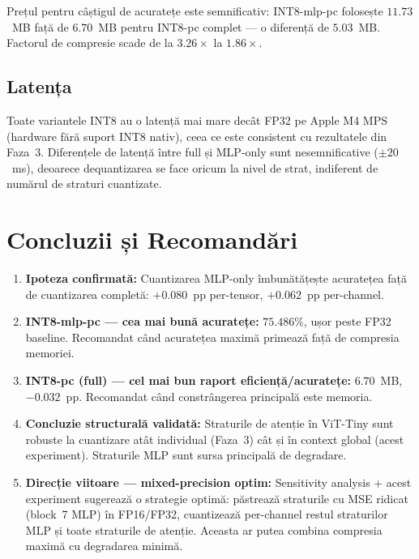 \documentclass[12pt,a4paper]{article}
\begin{document}
Prețul pentru câștigul de acuratețe este semnificativ: INT8-mlp-pc
folosește $11.73$~MB față de $6.70$~MB pentru INT8-pc complet ---
o diferență de $5.03$~MB. Factorul de compresie scade de la
$3.26\times$ la $1.86\times$.

\subsection{Latența}

Toate variantele INT8 au o latență mai mare decât FP32 pe Apple M4
MPS (hardware fără suport INT8 nativ), ceea ce este consistent cu
rezultatele din Faza~3. Diferențele de latență între full și MLP-only
sunt nesemnificative ($\pm 20$~ms), deoarece dequantizarea se face
oricum la nivel de strat, indiferent de numărul de straturi cuantizate.

\section{Concluzii și Recomandări}

\begin{enumerate}
  \item \textbf{Ipoteza confirmată:} Cuantizarea MLP-only îmbunătățește
    acuratețea față de cuantizarea completă: $+0.080$~pp per-tensor,
    $+0.062$~pp per-channel.

  \item \textbf{INT8-mlp-pc --- cea mai bună acuratețe:} $75.486\%$,
    ușor peste FP32 baseline. Recomandat când acuratețea maximă
    primează față de compresia memoriei.

  \item \textbf{INT8-pc (full) --- cel mai bun raport eficiență/acuratețe:}
    $6.70$~MB, $-0.032$~pp. Recomandat când constrângerea principală
    este memoria.

  \item \textbf{Concluzie structurală validată:} Straturile de atenție
    în ViT-Tiny sunt robuste la cuantizare atât individual (Faza~3)
    cât și în context global (acest experiment). Straturile MLP sunt
    sursa principală de degradare.

  \item \textbf{Direcție viitoare --- mixed-precision optim:} Sensitivity
    analysis + acest experiment sugerează o strategie optimă:
    păstrează straturile cu MSE ridicat (block~7 MLP) în FP16/FP32,
    cuantizează per-channel restul straturilor MLP și toate straturile
    de atenție. Aceasta ar putea combina compresia maximă cu degradarea
    minimă.
\end{enumerate}
\end{document}
